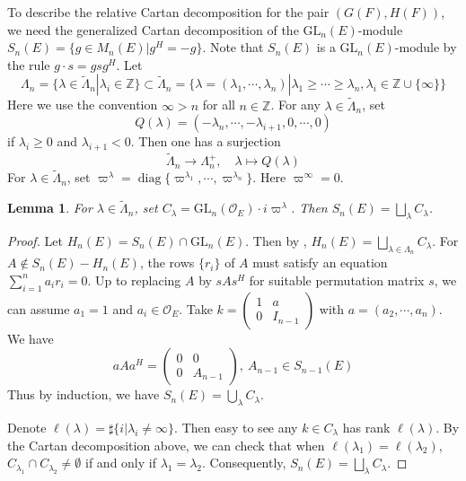 \documentclass{amsart}
\newtheorem{lemma}[theorem]{Lemma}
\theoremstyle{definition}
\theoremstyle{remark}
\newcommand{\1}{\mathbf{1}}
\newcommand{\GL}{\mathrm{GL}}
\DeclareMathOperator{\diag}{diag}
\theoremstyle{definition}
\newcommand{\CO}{{\mathcal {O}}}
\newcommand{\BZ}{{\mathbb {Z}}}
\begin{document}
To describe the relative Cartan decomposition for the pair $(G(F),H(F))$,  we need the generalized Cartan decomposition of the $\GL_n(E)$-module $S_n(E)=\{g\in M_n(E)| g^H=-g\}$. Note that $S_n(E)$ is a $\GL_n(E)$-module by the rule $g\cdot s=gsg^H$. Let \[\Lambda_n=\{\lambda\in\tilde{\Lambda}_n| \lambda_i\in\BZ\}\subset \tilde{\Lambda}_n=\{\lambda=(\lambda_1,\cdots,\lambda_n)| \lambda_1\geq\cdots\geq \lambda_n, \lambda_i\in\BZ\cup\{\infty\}\}\]
Here we use the convention $\infty>n$ for all $n\in\BZ$. For any $\lambda\in \tilde{\Lambda}_n$, set \[Q(\lambda)=(-\lambda_n,\cdots,-\lambda_{i+1},0,\cdots, 0)\] if $\lambda_i\geq0$ and $\lambda_{i+1}<0$. Then one has a surjection 
\[\tilde{\Lambda}_n\to \Lambda_n^+,\quad \lambda\mapsto Q(\lambda)\]
For $\lambda\in\tilde{\Lambda}_n$, set $\varpi^\lambda=\diag\{\varpi^{\lambda_1},\cdots,\varpi^{\lambda_n}\}$. Here  $\varpi^\infty=0$. 
\begin{lemma}\label{generalized Cartan}For $\lambda\in \tilde{\Lambda}_n$, set $C_\lambda=\GL_n(\CO_E)\cdot i \varpi^\lambda $. Then  $S_n(E)=\bigsqcup_{\lambda} C_\lambda$. 
\end{lemma}
\begin{proof}Let $H_n(E)=S_n(E)\cap \GL_n(E)$. Then by \cite{Jac62}, $H_n(E)=\bigsqcup_{\lambda\in \Lambda_n}C_\lambda$. For $A\notin S_n(E)-H_n(E)$, the rows $\{r_i\}$ of $A$ must satisfy an equation $\sum_{i=1}^na_ir_i=0$. Up to replacing $A$ by $sAs^H$ for suitable permutation matrix $s$, we can assume $a_1=1$ and $a_i\in\CO_E$. Take $k=\begin{pmatrix}1 & a\\ 0 & I_{n-1}\end{pmatrix}$ with $a=(a_2,\cdots,a_n)$. We have \[aAa^H=\begin{pmatrix} 0 & 0\\ 0 & A_{n-1}\end{pmatrix},\ A_{n-1}\in S_{n-1}(E)\]
Thus by induction, we have $S_n(E)=\bigcup_{\lambda} C_\lambda$.

Denote $\ell(\lambda)=\sharp\{i|\lambda_i\neq\infty\}$. Then easy to see any $k\in C_\lambda$ has rank $\ell(\lambda)$. By the Cartan decomposition above,  we can check that when  $\ell(\lambda_1)=\ell(\lambda_2)$, $C_{\lambda_1}\cap C_{\lambda_2}\neq\emptyset$ if and only if $\lambda_1=\lambda_2$. Consequently, $S_n(E)=\bigsqcup_{\lambda} C_\lambda$. 
\end{proof}
\end{document}
